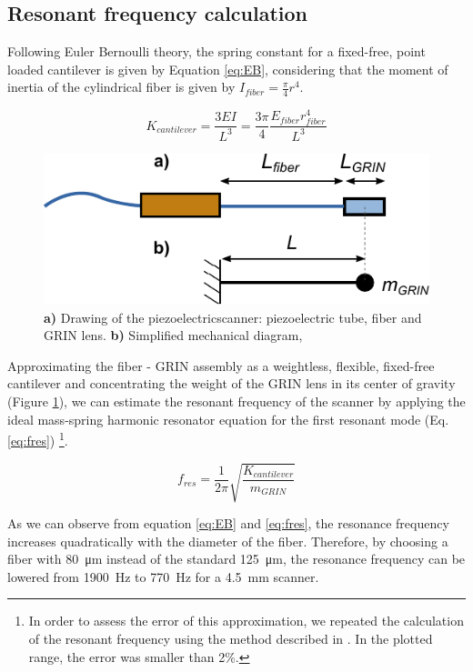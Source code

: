 \subsection{Resonant frequency calculation}
Following Euler Bernoulli theory, the spring constant for a fixed-free, point loaded cantilever is given by Equation \ref{eq:EB}, considering that the moment of inertia of the cylindrical fiber is given by $I_{fiber} = \frac{\pi}{4} r^4$.


\begin{equation}
K_{cantilever} = \frac{3 E I}{L^3} = \frac{3 \pi}{4} \frac{E_{fiber} r_{fiber}^4}{L^3}
\label{eq:EB}
\end{equation}

\begin{figure}[h!]\centering
      \includegraphics{figures/30_DesignSimulation/Mechanical/EB.pdf}
      \caption{\textbf{a)} Drawing of the piezoelectricscanner: piezoelectric tube, fiber and GRIN lens. 
      \textbf{b)} Simplified mechanical diagram, }
      \label{fig:EB}
\end{figure}

Approximating the fiber - GRIN assembly as a weightless, flexible, fixed-free cantilever and concentrating the weight of the GRIN lens in its center of gravity (Figure \ref{fig:EB}), we can estimate the resonant frequency of the scanner by applying the ideal mass-spring harmonic resonator equation for the first resonant mode (Eq. \ref{eq:fres}) \footnote{In order to assess the error of this approximation, we repeated the calculation of the resonant frequency using the method described in \cite{Huo2010}. In the plotted range, the error was smaller than 2\%.}. 

\begin{equation}
f_{res} = \frac{1}{2 \pi} \sqrt{\frac{K_{cantilever}}{m_{\mathit{GRIN}}}} 
\label{eq:fres}
\end{equation}

As we can observe from equation \ref{eq:EB} and \ref{eq:fres}, the resonance frequency increases quadratically with the diameter of the fiber. Therefore, by choosing a fiber with \SI{80}{\micro\meter} instead of the standard \SI{125}{\micro\meter}, the resonance frequency can be lowered from \SI{1900}{\hertz} to \SI{770}{\hertz} for a \SI{4.5}{\milli\meter} scanner.

